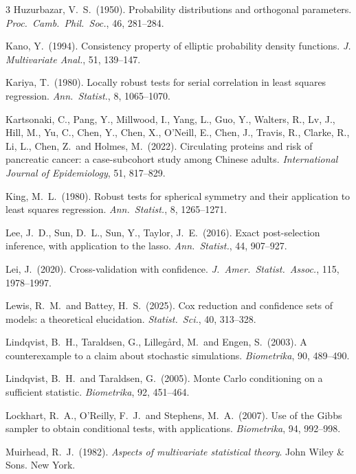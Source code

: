 \documentclass[10pt, reqno]{amsart}
\numberwithin{equation}{section}
\begin{document}
\begin{thebibliography}{3}
	Huzurbazar, V.~S.~(1950). Probability distributions and orthogonal parameters. \emph{Proc.~Camb.~Phil.~Soc.}, 46, 281--284.
	
	Kano, Y.~(1994). Consistency property of elliptic probability density functions. \emph{J. Multivariate Anal.}, 51, 139--147.
	
	Kariya, T.~(1980).
	Locally robust tests for serial correlation in least squares regression.	 \textit{Ann.~Statist.}, 8, 1065--1070.
	
	Kartsonaki, C., Pang, Y., Millwood, I., Yang, L., Guo, Y., Walters, R., Lv, J., Hill, M., Yu, C., Chen, Y., Chen, X., O'Neill, E., Chen, J., Travis, R., Clarke, R., Li, L., Chen, Z.~and Holmes, M.~(2022).
	Circulating proteins and risk of pancreatic cancer: a case-subcohort study among Chinese adults. \emph{International Journal of Epidemiology}, 51, 817--829.
	
	
	King, M.~L.~(1980).
	Robust tests for spherical symmetry and their application to least squares regression.	 \textit{Ann.~Statist.}, 8, 1265--1271.
	
	Lee, J.~D., Sun, D.~L., Sun, Y., Taylor, J.~E.~(2016). Exact post-selection inference, with application to the lasso. \emph{Ann.~Statist.}, 44,  907--927.
	
	Lei, J.~(2020). Cross-validation with confidence.
	\emph{J.~Amer.~Statist.~Assoc.}, 115, 1978--1997.
	
	Lewis, R.~M.~and Battey, H.~S.~(2025). Cox reduction and confidence sets of models: a theoretical elucidation. \emph{Statist.~Sci.}, 40, 313--328.
	
	Lindqvist, B.~H., Taraldsen, G., Lilleg{\aa}rd, M.~and Engen, S.~(2003). A counterexample to a claim about stochastic simulations. \emph{Biometrika}, 90, 489--490.
	
	Lindqvist, B.~H.~and Taraldsen, G.~(2005). Monte Carlo conditioning on a sufficient statistic. \emph{Biometrika}, 92, 451--464.
	
	Lockhart, R.~A., O'Reilly, F.~J.~and Stephens, M.~A.~(2007). Use of the Gibbs sampler to obtain conditional tests, with applications. \emph{Biometrika}, 94, 992--998.
	
	
	
	Muirhead, R.~J.~(1982). \emph{Aspects of multivariate statistical theory}. John Wiley \& Sons. New York.
	

\end{thebibliography}
\end{document}

